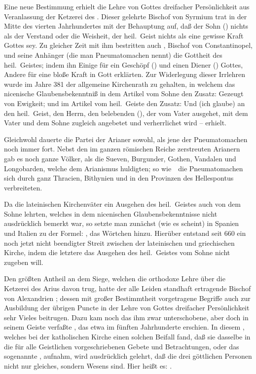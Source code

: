 \begin{aufza}
\item Eine neue Bestimmung erhielt die Lehre von Gottes dreifacher Persönlichkeit aus Veranlassung der Ketzerei des . Dieser gelehrte Bischof von Syrmium trat in der Mitte des vierten Jahrhundertes mit der Behauptung auf, daß der Sohn () nichts als der Verstand oder die Weisheit, der heil.\ Geist nichts als eine gewisse Kraft Gottes sey. Zu gleicher Zeit mit ihm bestritten auch , Bischof von Constantinopel, und seine Anhänger (die man Pneumatomachen nennt) die Gottheit des heil.\ Geistes; indem ihn Einige für ein Geschöpf () und einen Diener () Gottes, Andere für eine bloße Kraft in Gott erklärten. Zur Widerlegung dieser Irrlehren wurde im Jahre 381 der allgemeine Kirchenrath zu  gehalten, in welchem das nicenische Glaubensbekenntniß in dem Artikel vom Sohne den Zusatz: Gezeugt von Ewigkeit; und im Artikel vom heil.\ Geiste den Zusatz: Und (ich glaube) an den heil.\ Geist, den Herrn, den belebenden (), der vom Vater ausgehet, mit dem Vater und dem Sohne zugleich angebetet und verherrlichet wird -- erhielt.
\item Gleichwohl dauerte die Partei der Arianer sowohl, als jene der Pneumatomachen noch immer fort. Nebst den im ganzen römischen Reiche zerstreuten Arianern gab es noch ganze Völker, als die Sueven, Burgunder, Gothen, Vandalen und Longobarden, welche dem Arianismus huldigten;
so wie~\ die Pneumatomachen sich durch ganz Thracien, Bithynien und in den Provinzen des Hellespontus verbreiteten.
\item Da die lateinischen Kirchenväter ein Ausgehen des heil.\ Geistes auch von dem Sohne lehrten, welches in dem nicenischen Glaubensbekenntnisse nicht ausdrücklich bemerkt war, so setzte man zunächst (wie es scheint) in Spanien und Italien zu der Formel: , das Wörtchen  hinzu. Hierüber entstand seit 660 ein noch jetzt nicht beendigter Streit zwischen der lateinischen und griechischen Kirche, indem die letztere das Ausgehen des heil.\ Geistes vom Sohne nicht zugeben will.
\item Den größten Antheil an dem Siege, welchen die orthodoxe Lehre über die Ketzerei des Arius davon trug, hatte der alle Leiden standhaft ertragende Bischof von Alexandrien ; dessen mit großer Bestimmtheit vorgetragene Begriffe auch zur Ausbildung der übrigen Puncte in der Lehre von Gottes dreifacher Persönlichkeit sehr Vieles beitrugen. Dazu kam noch das ihm zwar unterschobene, aber doch in seinem Geiste verfaßte , das etwa im fünften Jahrhunderte erschien. In diesem , welches bei der katholischen Kirche einen solchen Beifall fand, daß sie dasselbe in die für alle Geistlichen vorgeschriebenen Gebete und Betrachtungen, oder das sogenannte , aufnahm, wird ausdrücklich gelehrt, daß die drei göttlichen Personen nicht nur gleiches, sondern  Wesens sind. Hier heißt es: . \Usw\

\end{aufza}
